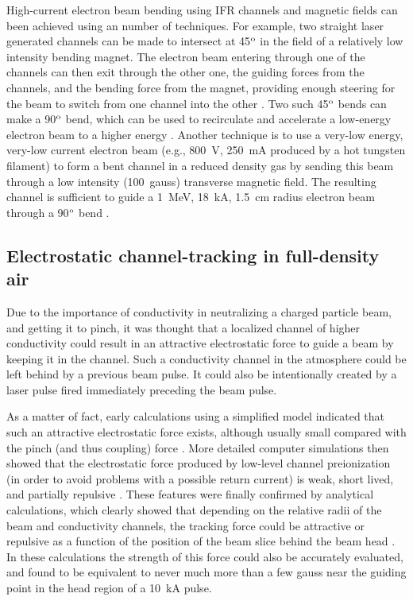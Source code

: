 \documentclass [12pt,a4paper,     ]{report} %
\begin{document}
  High-current electron beam bending using IFR channels and magnetic fields can been achieved using an number of techniques.  For example, two straight laser generated channels can be made to intersect at 45$^{\rm{o}}$ in the field of a relatively low intensity bending magnet.  The electron beam entering through one of the channels can then exit through the other one, the guiding forces from the channels, and the bending force from the magnet, providing enough steering for the beam to switch from one channel into the other \cite{FROST1985-}.  Two such 45$^{\rm{o}}$ bends can make a 90$^{\rm{o}}$ bend, which can be used to recirculate and accelerate a low-energy electron beam to a higher energy \cite{FROST1985-,SHOPE1986-}.  Another technique is to use a very-low energy, very-low current electron beam (e.g., 800~V, 250~mA produced by a hot tungsten filament) to form a bent channel in a reduced density gas by sending this beam through a low intensity (100~gauss) transverse magnetic field.  The resulting channel is sufficient to guide a 1~MeV, 18~kA, 1.5~cm radius electron beam through a 90$^{\rm{o}}$ bend \cite{SHOPE1985-}.


\subsection{Electrostatic channel-tracking in full-density air}

Due to the importance of conductivity in neutralizing a charged particle beam, and getting it to pinch, it was thought that a localized channel of higher conductivity could result in an attractive  electrostatic force to guide a beam by keeping it in the channel.  Such a conductivity channel in the atmosphere could be left behind by a previous beam pulse.  It could also be intentionally created by a laser pulse fired immediately preceding the beam pulse. 

    As a matter of fact, early calculations using a simplified model indicated that such an attractive electrostatic force exists, although usually small compared with the pinch (and thus coupling) force \cite[p.8]{LEE--1983A}.  More detailed computer simulations then showed that the electrostatic force produced by low-level channel preionization (in order to avoid problems with a possible return current) is weak, short lived, and partially repulsive \cite{HUI--1984A}.  These features were finally confirmed by analytical calculations, which clearly showed that depending on the relative radii of the beam and conductivity channels, the tracking force could be attractive or repulsive as a function of the position of the beam slice behind the beam head \cite{OBRIE1990A}.  In these calculations the strength of this force could also be accurately evaluated, and found to be equivalent to never much more than a few gauss near the guiding point in the head  region of a 10~kA pulse.
\end{document}
